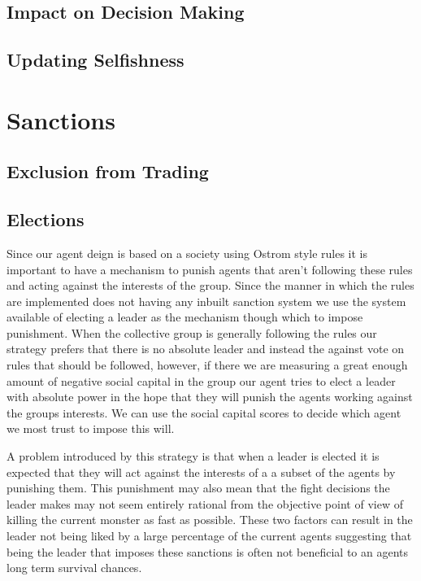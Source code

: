 \subsection{Impact on Decision Making}

\subsection{Updating Selfishness}


\section{Sanctions}

\subsection{Exclusion from Trading}

\subsection{Elections}

Since our agent deign is based on a society using Ostrom style rules it is important to have a mechanism to punish agents that aren't following these rules and acting against the interests of the group. Since the manner in which the rules are implemented does not having any inbuilt sanction system we use the system available of electing a leader as the mechanism though which to impose punishment. When the collective group is generally following the rules our strategy prefers that there is no absolute leader and instead the against vote on rules that should be followed, however, if there we are measuring a great enough amount of negative social capital in the group our agent tries to elect a leader with absolute power in the hope that they will punish the agents working against the groups interests. We can use the social capital scores to decide which agent we most trust to impose this will. 

A problem introduced by this strategy is that when a leader is elected it is expected that they will act against the interests of a a subset of the agents by punishing them. This punishment may also mean that the fight decisions the leader makes may not seem entirely rational from the objective point of view of killing the current monster as fast as possible. These two factors can result in the leader not being liked by a large percentage of the current agents suggesting that being the leader that imposes these sanctions is often not beneficial to an agents long term survival chances. 

